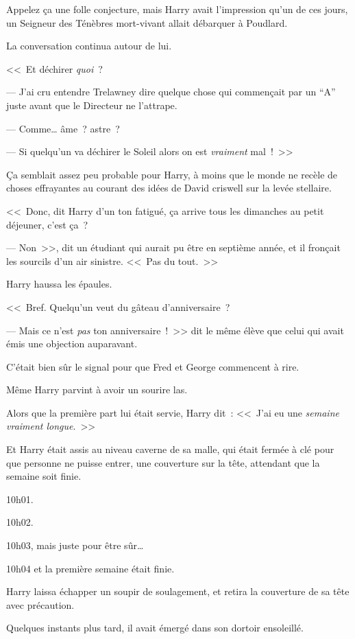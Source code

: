 Appelez ça une folle conjecture, mais Harry avait l'impression qu'un de ces jours, un Seigneur des Ténèbres mort-vivant allait débarquer à Poudlard.

La conversation continua autour de lui.

<<~Et déchirer \emph{quoi}~?

--- J'ai cru entendre Trelawney dire quelque chose qui commençait par un “A” juste avant que le Directeur ne l'attrape.

--- Comme… âme~? astre~?

--- Si quelqu'un va déchirer le Soleil alors on est \emph{vraiment} mal~!~>>

Ça semblait assez peu probable pour Harry, à moins que le monde ne recèle de choses effrayantes au courant des idées de David criswell sur la levée stellaire.

<<~Donc, dit Harry d'un ton fatigué, ça arrive tous les dimanches au petit déjeuner, c'est ça~?

--- Non~>>, dit un étudiant qui aurait pu être en septième année, et il fronçait les sourcils d'un air sinistre. <<~Pas du tout.~>>

Harry haussa les épaules.

<<~Bref. Quelqu'un veut du gâteau d'anniversaire~?

--- Mais ce n'est \emph{pas} ton anniversaire~!~>> dit le même élève que celui qui avait émis une objection auparavant.

C'était bien sûr le signal pour que Fred et George commencent à rire.

Même Harry parvint à avoir un sourire las.

Alors que la première part lui était servie, Harry dit~: <<~J'ai eu une \emph{semaine vraiment longue}.~>>

\later

Et Harry était assis au niveau caverne de sa malle, qui était fermée à clé pour que personne ne puisse entrer, une couverture sur la tête, attendant que la semaine soit finie.

10h01.

10h02.

10h03, mais juste pour être sûr…

10h04 et la première semaine était finie.

Harry laissa échapper un soupir de soulagement, et retira la couverture de sa tête avec précaution.

Quelques instants plus tard, il avait émergé dans son dortoir ensoleillé.

